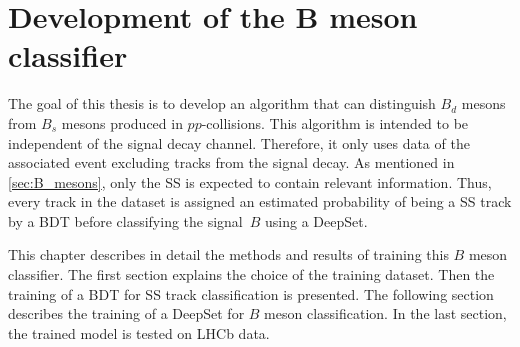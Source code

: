 \chapter[Development of the \texorpdfstring{$\symbf{B}$}{B} meson classifier]{Development of the \texorpdfstring{$\symbf{B}$}{B} meson classifier}

The goal of this thesis is to develop an algorithm that can distinguish $B_d$ mesons from $B_s$ mesons produced in $pp$-collisions.
This algorithm is intended to be independent of the signal decay channel. 
Therefore, it only uses data of the associated event excluding tracks from the signal decay.
As mentioned in \cref{sec:B_mesons}, only the SS is expected to contain relevant information.
Thus, every track in the dataset is assigned an estimated probability of being a SS track by a BDT before classifying the signal~$B$ using a DeepSet.

This chapter describes in detail the methods and results of training this $B$ meson classifier.
The first section explains the choice of the training dataset.
Then the training of a BDT for SS track classification is presented.
The following section describes the training of a DeepSet for $B$ meson classification.
In the last section, the trained model is tested on LHCb data.




